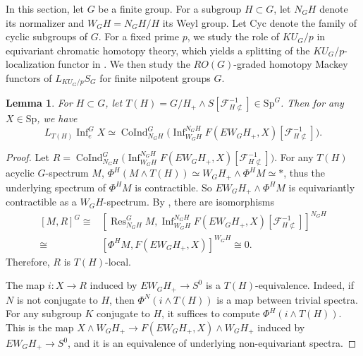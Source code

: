 \documentclass{amsart}
\theoremstyle{plain}
\newtheorem{lemma}[theorem]{Lemma}
\theoremstyle{definition}
\theoremstyle{remark}
\begin{document}
In this section, let $G$ be a finite group. For a subgroup $H\subset G$, let $N_G H$ denote its normalizer and $W_G H=N_G H/H$ its Weyl group. Let $\mathrm{Cyc}$ denote the family of cyclic subgroups of $G$. For a fixed prime $p$, we study the role of $KU_G/p$ in equivariant chromatic homotopy theory, which yields a splitting of the $KU_G/p$-localization functor in . We then study the $RO(G)$-graded homotopy Mackey functors of $L_{KU_G/p}S_G$ for finite nilpotent groups $G$.

\begin{lemma}\label{lem:TH local}
    For $H\subset G$, let $T(H)=G/H_+\wedge S[\mathcal{F}_{H\not\subset}^{-1}]\in \mathrm{Sp}^G$. Then for any $X\in \mathrm{Sp}$, we have 
    \[
      L_{T(H)} \operatorname{Inf}_e^G X \simeq \operatorname{CoInd}_{N_GH}^G\bigl( \operatorname{Inf}_{W_G H}^{N_G H} F(EW_G H_+, X)[\mathcal{F}_{H\not\subset}^{-1}] \bigr).
    \]
\end{lemma}
\begin{proof}
    Let $R=\operatorname{CoInd}_{N_GH}^G\bigl( \operatorname{Inf}_{W_G H}^{N_G H} F(EW_G H_+, X)[\mathcal{F}_{H\not\subset}^{-1}] \bigr)$. For any $T(H)$ acyclic $G$-spectrum $M$, 
    $\Phi^H(M\wedge T(H))\simeq W_G H_+\wedge \Phi^H M\simeq \ast$, thus the underlying spectrum of $\Phi^H M$ is contractible. So $EW_G H_+\wedge \Phi^H M$ is equivariantly contractible as a $W_G H$-spectrum.
    By , there are isomorphisms
    \[
    \begin{aligned}
        [M,R]^G
        \cong & [\operatorname{Res}_{N_GH}^G M, \operatorname{Inf}_{W_G H}^{N_G H} F(EW_G H_+, X)[\mathcal{F}_{H\not\subset}^{-1}]]^{N_GH}\\
        \cong & [\Phi^H M, F(EW_GH_+, X)]^{W_G H}\cong 0.
    \end{aligned}
    \]
    Therefore, $R$ is $T(H)$-local. 

    The map 
    $i:X\to R$
    induced by $EW_G H_+\to S^0$ is a $T(H)$-equivalence. Indeed, if $N$ is not conjugate to $H$, then $\Phi^N(i \wedge T(H))$ is a map between trivial spectra. For any subgroup $K$ conjugate to $H$, it suffices to compute $\Phi^H(i\wedge T(H))$. This is the map $X\wedge W_GH_+\to F(EW_GH_+, X)\wedge W_G H_+$ induced by $EW_GH_+\to S^0$, and it is an equivalence of underlying non-equivariant spectra.
\end{proof}
\end{document}

